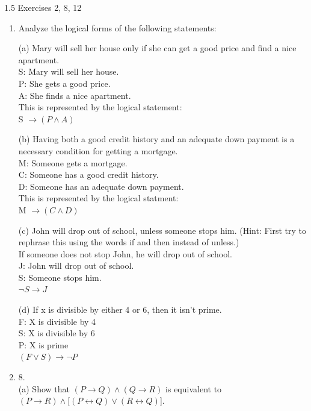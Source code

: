 \documentclass[12pt]{exam}
\begin{document}
\vspace{1em}
1.5 Exercises 2, 8, 12
\begin{enumerate} 

    \item Analyze the logical forms of the following statements:
    
(a) Mary will sell her house only if she can get a good price and find a
nice apartment.
\\S: Mary will sell her house.
\\P: She gets a good price.
\\A: She finds a nice apartment. 
\\This is represented by the logical statement: 
\\  S $\rightarrow (P \land A)$

(b) Having both a good credit history and an adequate down payment is a
necessary condition for getting a mortgage.
\\M: Someone gets a mortgage.
\\C: Someone has a good credit history.
\\D: Someone has an adequate down payment.
\\This is represented by the logical statment: 
\\ M $\rightarrow (C \land D)$

(c) John will drop out of school, unless someone stops him. (Hint: First
try to rephrase this using the words if and then instead of unless.)
\\If someone does not stop John, he will drop out of school.
\\J: John will drop out of school.
\\S: Someone stops him. 
\\ $\lnot S \rightarrow J$

(d) If x is divisible by either 4 or 6, then it isn’t prime.
\\F: X is divisible by 4 
\\S: X is divisible by 6
\\P: X is prime
\\ $(F \lor S) \rightarrow \lnot P$

\item 8. 
\\(a) Show that $(P \rightarrow Q) \land (Q \rightarrow R)$ is equivalent to $(P \rightarrow R) \land [(P \leftrightarrow Q) \lor (R \leftrightarrow Q)$].


\end{enumerate}
\end{document}
